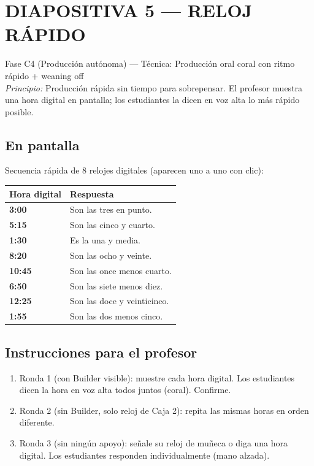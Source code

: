\documentclass[a4paper,11pt]{article}
\begin{document}
\section*{DIAPOSITIVA 5 — RELOJ RÁPIDO}

{\small Fase C4 (Producción autónoma) — Técnica: Producción oral coral con ritmo rápido + weaning off}\\
{\small\textit{Principio:} Producción rápida sin tiempo para sobrepensar. El profesor muestra una hora digital en pantalla; los estudiantes la dicen en voz alta lo más rápido posible.}

\vspace{0.5cm}

\subsection*{En pantalla}

Secuencia rápida de 8 relojes digitales (aparecen uno a uno con clic):

\vspace{0.3cm}

\begin{center}
\renewcommand{\arraystretch}{1.6}
\begin{tabular}{|>{\centering\arraybackslash}p{3cm}|>{\raggedright\arraybackslash}p{8cm}|}
\hline
\rowcolor{violeta!15}
\textbf{Hora digital} & \textbf{Respuesta} \\
\hline
\textbf{3:00} & Son las tres en punto. \\
\hline
\textbf{5:15} & Son las cinco y cuarto. \\
\hline
\textbf{1:30} & Es la una y media. \\
\hline
\textbf{8:20} & Son las ocho y veinte. \\
\hline
\textbf{10:45} & Son las once menos cuarto. \\
\hline
\textbf{6:50} & Son las siete menos diez. \\
\hline
\textbf{12:25} & Son las doce y veinticinco. \\
\hline
\textbf{1:55} & Son las dos menos cinco. \\
\hline
\end{tabular}
\end{center}

\vspace{0.5cm}

\subsection*{Instrucciones para el profesor}

\begin{enumerate}[leftmargin=1.5cm, itemsep=4pt]
\item Ronda 1 (con Builder visible): muestre cada hora digital. Los estudiantes dicen la hora en voz alta todos juntos (coral). Confirme.
\item Ronda 2 (sin Builder, solo reloj de Caja 2): repita las mismas horas en orden diferente.
\item Ronda 3 (sin ningún apoyo): señale su reloj de muñeca o diga una hora digital. Los estudiantes responden individualmente (mano alzada).
\end{enumerate}
\end{document}

